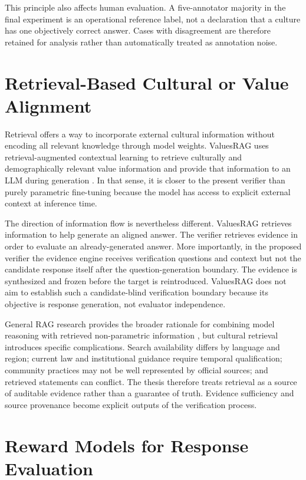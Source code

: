 This principle also affects human evaluation. A five-annotator majority in the final experiment is an operational reference label, not a declaration that a culture has one objectively correct answer. Cases with disagreement are therefore retained for analysis rather than automatically treated as annotation noise.

\section{Retrieval-Based Cultural or Value Alignment}

Retrieval offers a way to incorporate external cultural information without encoding all relevant knowledge through model weights. ValuesRAG uses retrieval-augmented contextual learning to retrieve culturally and demographically relevant value information and provide that information to an LLM during generation \parencite{seo2025valuesrag}. In that sense, it is closer to the present verifier than purely parametric fine-tuning because the model has access to explicit external context at inference time.

The direction of information flow is nevertheless different. ValuesRAG retrieves information to help generate an aligned answer. The verifier retrieves evidence in order to evaluate an already-generated answer. More importantly, in the proposed verifier the evidence engine receives verification questions and context but not the candidate response itself after the question-generation boundary. The evidence is synthesized and frozen before the target is reintroduced. ValuesRAG does not aim to establish such a candidate-blind verification boundary because its objective is response generation, not evaluator independence.

General RAG research provides the broader rationale for combining model reasoning with retrieved non-parametric information \parencite{lewis2020rag}, but cultural retrieval introduces specific complications. Search availability differs by language and region; current law and institutional guidance require temporal qualification; community practices may not be well represented by official sources; and retrieved statements can conflict. The thesis therefore treats retrieval as a source of auditable evidence rather than a guarantee of truth. Evidence sufficiency and source provenance become explicit outputs of the verification process.

\section{Reward Models for Response Evaluation}

